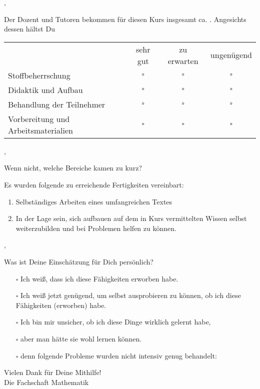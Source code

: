 \sep

Der Dozent und Tutoren bekommen für diesen Kurs insgesamt ca. . Angesichts dessen hältst Du

\begin{tabular}{lccc}
	& sehr gut & zu erwarten & ungenügend \\
	Stoffbeherrschung & $\square$ & $\square$ & $\square$ \\
	Didaktik und Aufbau & $\square$ & $\square$ & $\square$ \\
	Behandlung der Teilnehmer & $\square$ & $\square$ & $\square$ \\
	Vorbereitung und Arbeitsmaterialien & $\square$ & $\square$ & $\square$ \\
\end{tabular}

\sep

Wenn nicht, welche Bereiche kamen zu kurz? \hrulefill

\hrulefill

\hrulefill

\hrulefill

\newpage

Es wurden folgende zu erreichende Fertigkeiten vereinbart:

\begin{enumerate}
	\item
		Selbständiges Arbeiten eines umfangreichen Textes

	\item
		In der Lage sein, sich aufbauen auf dem in Kurs vermittelten Wissen
		selbst weiterzubilden und bei Problemen helfen zu können.
\end{enumerate}

\sep

Was ist Deine Einschätzung für Dich persönlich?
\begin{itemize}
	\item[$\square$]
		Ich weiß, dass ich diese Fähigkeiten erworben habe.
	\item[$\square$]
		Ich weiß jetzt genügend, um selbst ausprobieren zu können, ob ich diese
		Fähigkeiten (erworben) habe.
	\item[$\square$]
		Ich bin mir unsicher, ob ich diese Dinge wirklich gelernt habe,
	\item[$\square$]
		aber man hätte sie wohl lernen können.
	\item[$\square$]
		denn folgende Probleme wurden nicht intensiv genug behandelt: \hrulefill

		\hrulefill

		\hrulefill

		\hrulefill
\end{itemize}

\vfill

\begin{flushright}
	Vielen Dank für Deine Mithilfe! \\
	Die Fachschaft Mathematik
\end{flushright}



